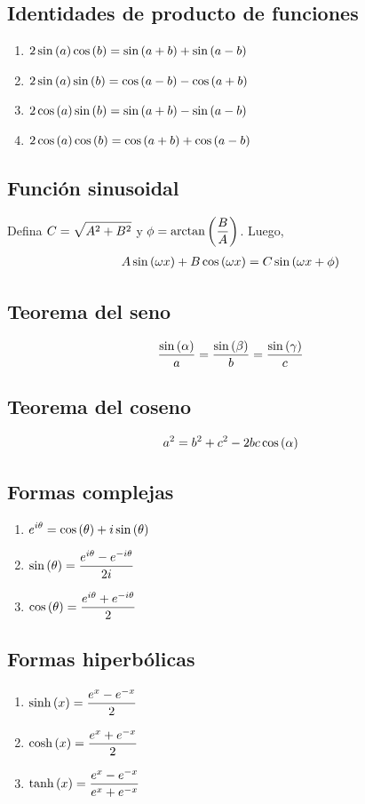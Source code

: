 \documentclass[../../main.tex]{subfiles}
\begin{document}
    \subsection{Identidades de producto de funciones}
        \begin{enumerate}
        	\item $\displaystyle 2 \sin\left( a \right) \cos\left( b \right) = \sin\left( a+b \right) + \sin\left( a-b \right)$
        	\item $\displaystyle 2 \sin\left( a \right) \sin\left( b \right) = \cos\left( a-b \right) - \cos\left( a+b \right)$
        	\item $\displaystyle 2 \cos\left( a \right) \sin\left( b \right) = \sin\left( a+b \right) - \sin\left( a-b \right)$
        	\item $\displaystyle 2 \cos\left( a \right) \cos\left( b \right) = \cos\left( a+b \right) + \cos\left( a-b \right)$
        \end{enumerate}
    
    \subsection{Función sinusoidal}
        Defina $\displaystyle C = \sqrt{A^2+B^2}$ y $\displaystyle \phi = \arctan\left( \frac B A \right)$. Luego,
        \begin{align*}
        	A \sin\left( \omega x \right) + B \cos\left( \omega x \right) = C \sin\left( \omega x + \phi \right)
        \end{align*}
    
    \subsection{Teorema del seno}
        \begin{align*}
        	\frac {\sin\left( \alpha \right)} a = \frac {\sin\left( \beta \right)} b = \frac {\sin\left( \gamma \right)} c
        \end{align*}
    
    \subsection{Teorema del coseno}
        \begin{align*}
        	a^2 = b^2 + c^2 - 2bc \cos\left( \alpha \right)
        \end{align*}
    
    \subsection{Formas complejas}
        \begin{enumerate}
        	\item $\displaystyle e^{i \theta} = \cos\left( \theta \right) + i \sin\left( \theta \right)$
        	\item $\displaystyle \sin\left( \theta \right) = \frac{e^{i\theta} - e^{-i \theta}}{2i}$
        	\item $\displaystyle \cos\left( \theta \right) = \frac{e^{i\theta} + e^{-i \theta}}{2}$
        \end{enumerate}

    \subsection{Formas hiperbólicas}
        \begin{enumerate}
        	\item $\displaystyle \sinh\left( x \right) = \frac{e^{x} - e^{-x}}{2}$
        	\item $\displaystyle \cosh\left( x \right) = \frac{e^{x} + e^{-x}}{2}$
        	\item $\displaystyle \tanh\left( x \right) = \frac{e^{x} - e^{-x}}{e^{x} + e^{-x}}$
        \end{enumerate}
    
\end{document}
